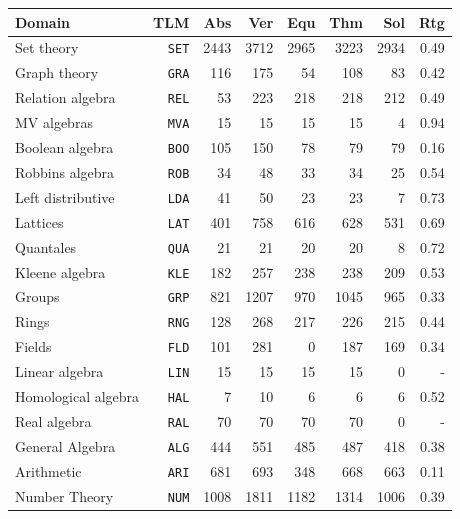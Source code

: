 \documentclass[runningheads]{llncs}
\begin{document}

\begin{table}[tb]
\begin{center}
\setlength{\tabcolsep}{4pt}
\begin{tabular}{lr|rr|rrrr}
Domain              & TLM       & Abs  & Ver  & Equ  & Thm  & Sol  & Rtg \\
\hline
Set theory          & {\tt SET} & 2443 & 3712 & 2965 & 3223 & 2934 & 0.49 \\
Graph theory        & {\tt GRA} &  116 &  175 &   54 &  108 &   83 & 0.42 \\
Relation algebra    & {\tt REL} &   53 &  223 &  218 &  218 &  212 & 0.49 \\
MV algebras         & {\tt MVA} &   15 &   15 &   15 &   15 &    4 & 0.94 \\
Boolean algebra     & {\tt BOO} &  105 &  150 &   78 &   79 &   79 & 0.16 \\
Robbins algebra     & {\tt ROB} &   34 &   48 &   33 &   34 &   25 & 0.54 \\
Left distributive   & {\tt LDA} &   41 &   50 &   23 &   23 &    7 & 0.73 \\
Lattices            & {\tt LAT} &  401 &  758 &  616 &  628 &  531 & 0.69 \\
Quantales           & {\tt QUA} &   21 &   21 &   20 &   20 &    8 & 0.72 \\
Kleene algebra      & {\tt KLE} &  182 &  257 &  238 &  238 &  209 & 0.53 \\
Groups              & {\tt GRP} &  821 & 1207 &  970 & 1045 &  965 & 0.33 \\
Rings               & {\tt RNG} &  128 &  268 &  217 &  226 &  215 & 0.44 \\
Fields              & {\tt FLD} &  101 &  281 &    0 &  187 &  169 & 0.34 \\
Linear algebra      & {\tt LIN} &   15 &   15 &   15 &   15 &    0 & -    \\
Homological algebra & {\tt HAL} &    7 &   10 &    6 &    6 &    6 & 0.52 \\
Real algebra        & {\tt RAL} &   70 &   70 &   70 &   70 &    0 & -    \\
General Algebra     & {\tt ALG} &  444 &  551 &  485 &  487 &  418 & 0.38 \\
Arithmetic          & {\tt ARI} &  681 &  693 &  348 &  668 &  663 & 0.11 \\
Number Theory       & {\tt NUM} & 1008 & 1811 & 1182 & 1314 & 1006 & 0.39 \\

\end{tabular}
\end{center}
\end{table}
\end{document}
